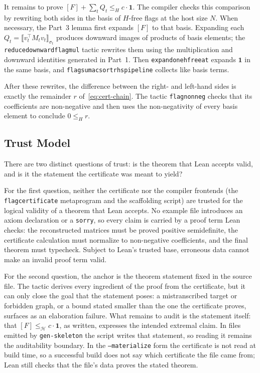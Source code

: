 \documentclass[acmsmall,screen=true,acmthm=false]{acmart}
\DeclareRobustCommand{\lean}[1]{{\def\_{\textunderscore\allowbreak}\texttt{#1}}}
\begin{document}
It remains to prove $[F]+\sum_tQ_t\leq_H c\cdot\mathbf{1}$.  The compiler checks
this comparison by rewriting both sides in the basis of $H$-free flags at the
host size $N$.  When necessary, the Part~3 lemma first expands $[F]$ to that
basis.
Expanding each $Q_t=\bigl\llbracket v_t^\top M_t v_t\bigr\rrbracket_{\sigma_t}$
produces downward images of products of basis
elements; the \lean{reduce\_downward\_flagmul} tactic rewrites them using the
multiplication and downward identities generated in Part~1.  Then
\lean{expand\_one\_hfree\_at} expands $\mathbf{1}$ in the same basis, and
\lean{flagsum\_ac\_sort\_rhs\_pipeline} collects like basis terms.

After these rewrites, the difference between the right- and left-hand sides is
exactly the remainder $r$ of~\eqref{eq:cert-chain}.  The tactic
\lean{flag\_nonneg} checks that its coefficients are non-negative and then uses
the non-negativity of every basis element to conclude $0\leq_H r$.

\subsection{Trust Model}
\label{sec:flagmatic-trust}

There are two distinct questions of trust: is the theorem that Lean accepts
valid, and is it the statement the certificate was meant to yield?

For the first question, neither the certificate nor the compiler frontends
(the \lean{flag\_certificate} metaprogram and the scaffolding script) are
trusted for the logical validity of a theorem that Lean accepts.  No example
file introduces an axiom declaration or a \lean{sorry}, so every claim is carried by a proof term Lean checks: the
reconstructed matrices must be proved positive semidefinite, the certificate
calculation must normalize to non-negative coefficients, and the final
theorem must typecheck.  Subject to Lean's trusted base, erroneous data
cannot make an invalid proof term valid.

For the second question, the anchor is the theorem statement fixed in the
source file.  The tactic derives every ingredient of the proof from the
certificate, but it can only close the goal that the statement poses: a
mistranscribed target or forbidden graph, or a bound stated smaller than the
one the certificate proves, surfaces as an elaboration
failure.  What remains to audit is the statement itself: that
$[F]\leq_{\mathcal H}c\cdot\mathbf 1$, as written, expresses the intended
extremal claim.  In files emitted by \lean{gen-skeleton} the script writes that
statement, so reading it remains the auditability boundary.  In
the \lean{--materialize} form the certificate is not read at build time, so a
successful build does not say which certificate the file came from; Lean
still checks that the file's data proves the stated theorem.
\end{document}
